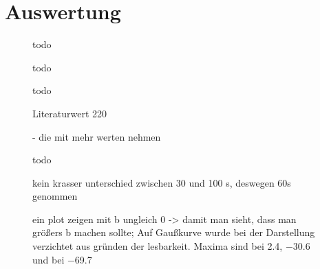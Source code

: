 \section{Auswertung}
\begin{figure}[H]
    \centering
    
    \caption{todo}
    \label{fig:Sonnenabbild}
\end{figure}

\begin{figure}[H]
    \centering
    
    \caption{todo}
    \label{fig:Sonnenkreuz_Az}
\end{figure}

\begin{figure}[H]
    \centering
    
    \caption{todo}
    \label{fig:Sonnenkreuz_Alt}
\end{figure}

\begin{figure}[H]
    \centering
    
    \caption{Literaturwert \SI{220}{} \cite{LSR}}
    \label{fig:VvonR}
\end{figure}

%     

\begin{figure}[H]
    \centering
       
    \caption{- die mit mehr werten nehmen}
    \label{fig:Milchstrassesafe}
\end{figure}

\begin{figure}[H]
    \centering
       
    \caption{todo}
    \label{fig:Belichtungszeit}
\end{figure}

\begin{figure}[H]
    \centering
       
    \caption{kein krasser unterschied zwischen 30 und 100 s, deswegen 60s genommen}
    \label{fig:BelichtungszeitExtremal}
\end{figure}

\begin{figure}[H]
    \centering
       
    \caption{ein plot zeigen mit b ungleich 0 -> damit man sieht, dass man größers b machen sollte; Auf Gaußkurve wurde bei der Darstellung verzichtet aus gründen der lesbarkeit. Maxima sind bei \SI{2.4}{}, \SI{-30.6}{} und bei \SI{-69.7}{}}
    \label{fig:bungleichnull}
\end{figure}

